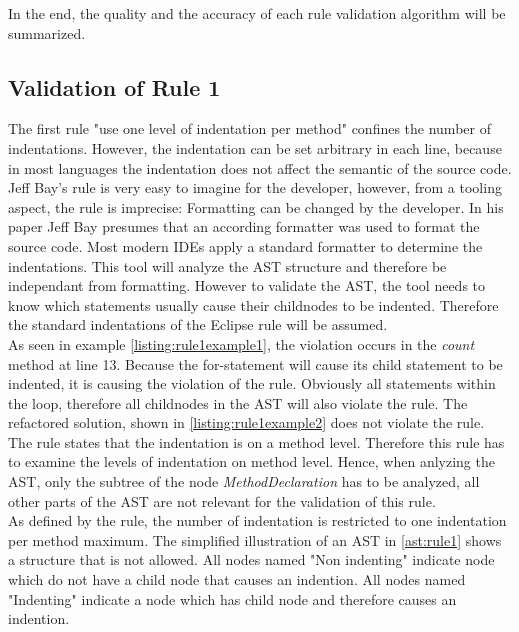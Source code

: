 In the end, the quality and the accuracy of each rule validation algorithm will be summarized. 


\subsection*{Validation of Rule 1}
The first rule "use one level of indentation per method" confines the number of indentations. However, the indentation can be set arbitrary in each line, because in most languages the indentation does not affect the semantic of the source code. Jeff Bay's rule is very easy to imagine for the developer, however, from a tooling aspect, the rule is imprecise: Formatting can be changed by the developer. In his paper Jeff Bay presumes that an according formatter was used to format the source code. Most modern \ac{IDE}s apply a standard formatter to determine the indentations. This tool will analyze the \ac{AST} structure and therefore be independant from formatting. However to validate the \ac{AST}, the tool needs to know which statements usually cause their childnodes to be indented. Therefore the standard indentations of the Eclipse rule will be assumed.
\\

As seen in example \ref{listing:rule1example1}, the violation occurs in the \textit{count} method at line 13. Because the for-statement will cause its child statement to be indented, it is causing the violation of the rule. Obviously all statements within the loop, therefore all childnodes in the \ac{AST} will also violate the rule. The refactored solution, shown in \ref{listing:rule1example2} does not violate the rule. 
\\

The rule states that the indentation is on a method level. Therefore this rule has to examine the levels of indentation on method level. Hence, when anlyzing the \ac{AST}, only the subtree of the node \textit{MethodDeclaration} has to be analyzed, all other parts of the \ac{AST} are not relevant for the validation of this rule.
\\

As defined by the rule, the number of indentation is restricted to one indentation per method maximum. The simplified illustration of an \ac{AST} in \ref{ast:rule1} shows a structure that is not allowed. All nodes named "Non indenting" indicate node which do not have a child node that causes an indention. All nodes named "Indenting" indicate a node which has child node and therefore causes an indention.
\\

